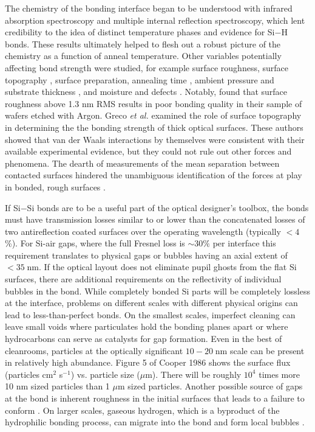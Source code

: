\documentclass[osajnl,preprint,showpacs,superscriptaddress,12pt]{revtex4-1} %
\begin{document}
The chemistry of the bonding interface began to be understood with infrared absorption spectroscopy and multiple internal reflection spectroscopy\cite{feijoo1994}, which lent credibility to the idea of distinct temperature phases and evidence for Si$-$H bonds\cite{1995ApPhA..61..101R}.  These results ultimately helped to flesh out a robust picture of the chemistry as a function of anneal temperature\cite{1996JaJAP..35.2102R, 1998AnRMS..28..215G}.  Other variables potentially affecting bond strength were studied, for example surface roughness\cite{JJAP.37.4197}, surface topography \cite{2001JOptA...3...85G}, surface preparation\cite{1996ApPhL..68.2222T}, annealing time \cite{2000JAP....88.4404H}, ambient pressure and substrate thickness \cite{1995ApPhL..67..863G, 2007ApOpt..46.6793H}, and moisture and defects \cite{2001JAP....89.6013L}.  Notably, \cite{JJAP.37.4197} found that surface roughness above 1.3 nm RMS results in poor bonding quality in their sample of wafers etched with Argon.  Greco \emph{et al.} examined the role of surface topography in determining the the bonding strength of thick optical surfaces.  These authors showed that van der Waals interactions by themselves were consistent with their available experimental evidence, but they could not rule out other forces and phenomena.  The dearth of measurements of the mean separation between contacted surfaces hindered the unambiguous identification of the forces at play in bonded, rough surfaces \cite{2001JOptA...3...85G}.


If Si$-$Si bonds are to be a useful part of the optical designer's toolbox, the bonds must have transmission losses similar to or lower than the concatenated losses of two antireflection coated surfaces over the operating wavelength (typically $< 4$\%).  For Si-air gaps, where the full Fresnel loss is $\sim30\%$ per interface this requirement translates to physical gaps or bubbles having an axial extent of $ < 35\;$nm.  If the optical layout does not eliminate pupil ghosts from the flat Si surfaces, there are additional requirements on the reflectivity of individual bubbles in the bond. While completely bonded Si parts will be completely lossless at the interface, problems on different scales with different physical origins can lead to less-than-perfect bonds.  On the smallest scales, imperfect cleaning can leave small voids where particulates hold the bonding planes apart \cite{Mitani1990} or where hydrocarbons can serve as catalysts for gap formation.  Even in the best of cleanrooms, particles at the optically significant $10-20\;$nm scale can be present in relatively high abundance. Figure 5 of Cooper 1986 \cite{doi:10.1080/02786828608959094} shows the surface flux (particles cm$^2$ s$^{-1}$) vs. particle size ($\mu$m). There will be roughly $10^4$ times more 10 nm sized particles than 1 $\mu$m sized particles.  Another possible source of gaps at the bond is inherent roughness in the initial surfaces that leads to a failure to conform \cite{2001JOptA...3...85G}.  On larger scales, gaseous hydrogen, which is a byproduct of the hydrophilic bonding process, can migrate into the bond and form local bubbles \cite{Masteika2014}.  
\end{document}
